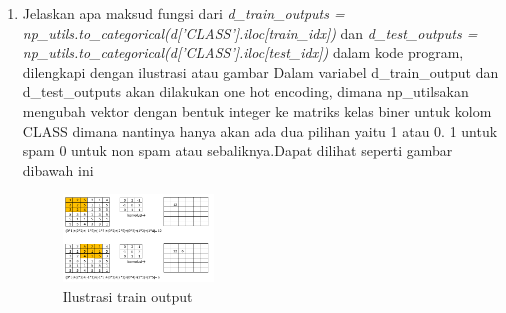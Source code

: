 \begin{enumerate}
        \item {Jelaskan apa maksud fungsi dari \emph{d\_train\_outputs = np\_utils.to\_categorical(d['CLASS'].iloc[train\_idx])} dan \emph{d\_test\_outputs = np\_utils.to\_categorical(d['CLASS'].iloc[test\_idx])} dalam kode program, dilengkapi dengan ilustrasi atau gambar}
        \subitem Dalam variabel d\_train\_output dan d\_test\_outputs akan dilakukan one hot encoding, dimana np\_utilsakan mengubah vektor dengan bentuk integer ke matriks kelas biner untuk kolom CLASS dimana nantinya hanya akan ada dua pilihan yaitu 1 atau 0. 1 untuk spam 0 untuk non spam atau sebaliknya.Dapat dilihat seperti gambar dibawah ini
        \begin{figure}[H]
            \includegraphics[width=4cm]{figures/1174039/chapter7/8.png}
            \centering
            \caption{Ilustrasi train output}
        \end{figure}


\end{enumerate}
